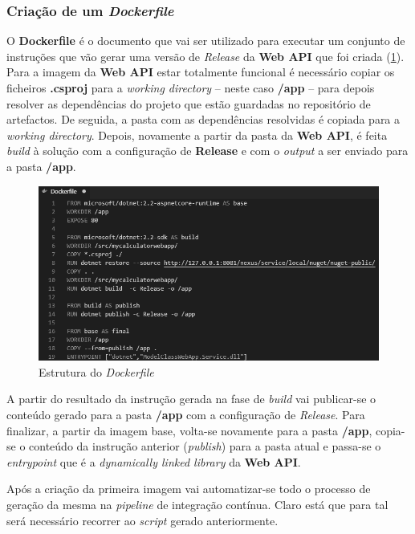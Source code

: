 \subsubsection{Criação de um \textit{Dockerfile}}

\hspace{1cm}O \textbf{Dockerfile} é o documento que vai ser utilizado para executar um conjunto de instruções que vão gerar uma versão de \textit{Release} da \textbf{Web API} que foi criada (\ref{Fig:Fig72}). Para a imagem da \textbf{Web API} estar totalmente funcional é necessário copiar os ficheiros \textbf{.csproj} para a \textit{working directory} -- neste caso \textbf{/app} -- para depois resolver as dependências do projeto que estão guardadas no repositório de artefactos. De seguida, a pasta com as dependências resolvidas é copiada para a \textit{working directory}. Depois, novamente a partir da pasta da \textbf{Web API}, é feita \textit{build} à solução com a configuração de \textbf{Release} e com o \textit{output} a ser enviado para a pasta \textbf{/app}. 

\begin{figure}[hbt!]
\centering
\includegraphics[width=0.9\linewidth]{Cap5/DockerfileCalculator.png}
\caption{Estrutura do \textit{Dockerfile}}
\label{Fig:Fig72}
\end{figure}

\hspace{1cm}A partir do resultado da instrução gerada na fase de \textit{build} vai publicar-se o conteúdo gerado para a pasta \textbf{/app} com a configuração de \textit{Release}. Para finalizar, a partir da imagem base, volta-se novamente para a pasta \textbf{/app}, copia-se o conteúdo da instrução anterior (\textit{publish}) para a pasta atual e passa-se o \textit{entrypoint} que é a \textit{dynamically linked library} da \textbf{Web API}.

\hspace{1cm}Após a criação da primeira imagem vai automatizar-se todo o processo de geração da mesma na \textit{pipeline} de integração contínua. Claro está que para tal será necessário recorrer ao \textit{script} gerado anteriormente.

